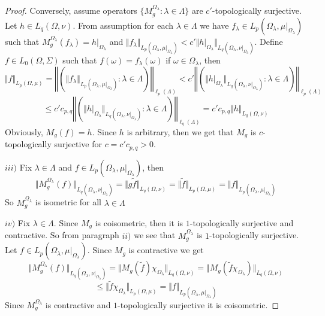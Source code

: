 \begin{proof}
Conversely, assume operators $\{M_g^{\Omega_\lambda}:\lambda\in\Lambda\}$ are $c'$-topologically surjective. Let $h\in L_q(\Omega,\nu)$. From assumption for each $\lambda\in\Lambda$ we have $f_\lambda\in L_p(\Omega_\lambda,\mu|_{\Omega_\lambda})$ such that $M_g^{\Omega_\lambda}(f_\lambda)=h|_{\Omega_\lambda}$ and $\Vert f_\lambda\Vert_{L_p(\Omega_\lambda,\mu|_{\Omega_\lambda})}< c'\Vert h|_{\Omega_\lambda}\Vert_{L_q(\Omega_\lambda,\nu|_{\Omega_\lambda})}$. Define $f\in L_0(\Omega,\Sigma)$ such that $f(\omega)=f_\lambda(\omega)$ if $\omega\in\Omega_\lambda$, then
$$
\Vert f\Vert_{L_p(\Omega,\mu)}
=\left\Vert\left(\Vert f_\lambda\Vert_{L_p(\Omega_\lambda,\mu|_{\Omega_\lambda})}:\lambda\in\Lambda\right)\right\Vert_{\ell_p(\Lambda)}
< c'\left\Vert\left(\Vert h|_{\Omega_\lambda}\Vert_{L_q(\Omega_\lambda,\nu|_{\Omega_\lambda})}:\lambda\in\Lambda\right)\right\Vert_{\ell_p(\Lambda)}
$$
$$
\leq c'c_{p,q}\left\Vert\left(\Vert h|_{\Omega_\lambda}\Vert_{L_q(\Omega_\lambda,\nu|_{\Omega_\lambda})}:\lambda\in\Lambda\right)\right\Vert_{\ell_q(\Lambda)}
=c'c_{p,q}\Vert h\Vert_{L_q(\Omega,\nu)}
$$
Obviously, $M_g(f)=h$. Since $h$ is arbitrary, then we get that $M_g$ is $c$-topologically surjective for $c=c'c_{p,q}>0$.

$iii)$ Fix $\lambda\in\Lambda$ and $f\in L_p(\Omega_\lambda,\mu|_{\Omega_\lambda})$, then 
$$
\Vert M_g^{\Omega_\lambda}(f)\Vert_{L_q(\Omega_\lambda,\nu|_{\Omega_\lambda})}
=\Vert g \widetilde{f}\Vert_{L_q(\Omega,\nu)}
=\Vert\widetilde{f}\Vert_{L_p(\Omega,\mu)}
=\Vert f\Vert_{L_p(\Omega_\lambda,\mu|_{\Omega_\lambda})}
$$
So $M_g^{\Omega_\lambda}$ is isometric for all $\lambda\in\Lambda$

$iv)$ Fix $\lambda\in\Lambda$. Since $M_g$ is coisometric, then it is $1$-topologically surjective and contractive. So from paragraph $ii)$ we see that $M_g^{\Omega_\lambda}$ is $1$-topologically surjective. Let $f\in L_p(\Omega_\lambda,\mu|_{\Omega_\lambda})$. Since $M_g$ is contractive we get
$$
\Vert M_g^{\Omega_\lambda}(f)\Vert_{L_q(\Omega_\lambda,\nu|_{\Omega_\lambda})}
=\Vert M_g(\widetilde{f})\chi_{\Omega_\lambda}\Vert_{L_q(\Omega,\nu)}
=\Vert M_g(\widetilde{f}\chi_{\Omega_\lambda})\Vert_{L_q(\Omega,\nu)}
$$
$$
\leq \Vert\widetilde{f}\chi_{\Omega_\lambda}\Vert_{L_p(\Omega,\mu)}
=\Vert f\Vert_{L_p(\Omega_{\lambda},\mu|_{\Omega_\lambda})}
$$
Since $M_g^{\Omega_\lambda}$ is contractive and $1$-topologically surjective it is coisometric.
\end{proof}


